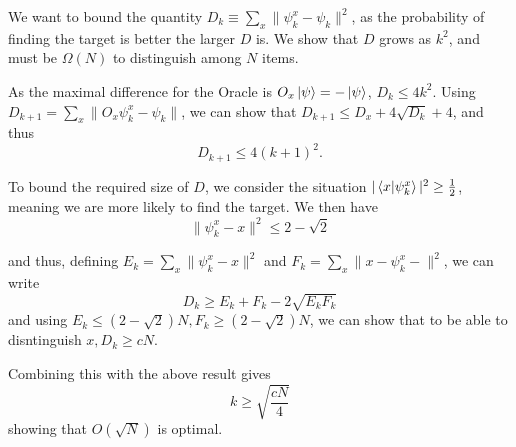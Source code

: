 \documentclass[11pt]{article}
\begin{document}
We want to bound the quantity $D_{k}\equiv \sum_{x} \| \psi_{k}^{x}-\psi_{k}\|^{2}$, as the probability of finding the target is better the larger $D$ is. We show that $D$ grows as $k^{2}$, and must be $\Omega
(N)$ to distinguish among $N$ items.

As the maximal difference for the Oracle is $O_{x}\ket{\psi}=-\ket{\psi}$, $D_{k}\leq 4 k^{2}$. Using
$D_{k+1}=\sum_{x} \| O_{x}\psi_{k}^{x} - \psi_{k}\|$, we can show that $ D_{k+1}\leq D_{x} + 4\sqrt{D_{k}}+4$, and thus
\[ D_{k+1}\leq 4(k+1)^{2}.\]

To bound the required size of $D$, we consider the situation $\vert \braket{x}{\psi_{k}^{x}}\vert^{2}\geq\frac{1}{2}$, meaning we are more likely to find the target. We then have
\[\| \psi_{k}^{x}-x\|^{2}\leq 2-\sqrt{2}\]

and thus, defining $E_{k}=\sum_{x}\| \psi_{k}^{x}-x\|^{2}$ and $F_{k} = \sum_{x}\| x- \psi_{k}^{x}-\|^{2}$, we can write
\[
D_{k}\geq E_{k}+F_{k} -2\sqrt{E_{k}F_{k}}
\]
and using $E_{k}\leq(2-\sqrt{2})N,F_{k}\geq(2-\sqrt{2})N$, we can show that to be able to disntinguish $x, D_{k}\geq cN$.

Combining this with the above result gives
\begin{equation}
    k\geq\sqrt{\frac{cN}{4}}
\end{equation}
showing that $O(\sqrt{N})$ is optimal.
\end{document}
